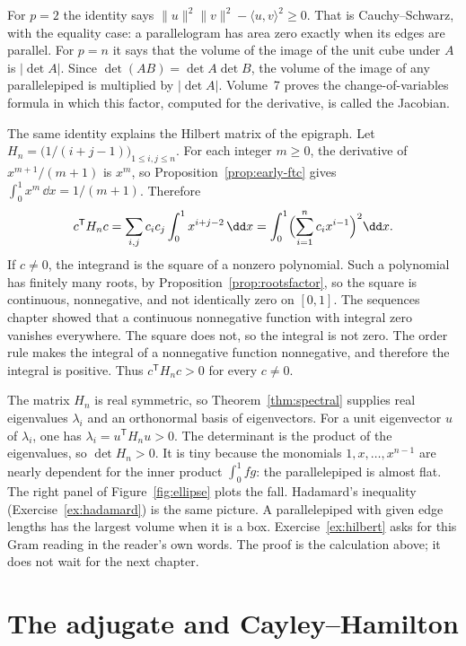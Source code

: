 For $p=2$ the identity says $\|u\|^2\|v\|^2-\langle u,v\rangle^2\ge0$. That is Cauchy--Schwarz, with the equality case: a parallelogram has area zero exactly when its edges are parallel. For $p=n$ it says that the volume of the image of the unit cube under $A$ is $|\det A|$. Since $\det(AB)=\det A\det B$, the volume of the image of any parallelepiped is multiplied by $|\det A|$. Volume~7 proves the change-of-variables formula in which this factor, computed for the derivative, is called the Jacobian.

The same identity explains the Hilbert matrix of the epigraph. Let $H_n=\bigl(1/(i+j-1)\bigr)_{1\le i,j\le n}$. For each integer $m\ge0$, the derivative of $x^{m+1}/(m+1)$ is $x^m$, so Proposition~\ref{prop:early-ftc} gives $\int_0^1 x^m\,\dd x=1/(m+1)$. Therefore
\[
c^{\mathsf T}H_nc=\sum_{i,j}c_ic_j\int_0^1 x^{i+j-2}\,\dd x=\int_0^1\Bigl(\sum_{i=1}^n c_ix^{i-1}\Bigr)^2\dd x.
\]
If $c\ne0$, the integrand is the square of a nonzero polynomial. Such a polynomial has finitely many roots, by Proposition~\ref{prop:rootsfactor}, so the square is continuous, nonnegative, and not identically zero on $[0,1]$. The sequences chapter showed that a continuous nonnegative function with integral zero vanishes everywhere. The square does not, so the integral is not zero. The order rule makes the integral of a nonnegative function nonnegative, and therefore the integral is positive. Thus $c^{\mathsf T}H_nc>0$ for every $c\ne0$.

The matrix $H_n$ is real symmetric, so Theorem~\ref{thm:spectral} supplies real eigenvalues $\lambda_i$ and an orthonormal basis of eigenvectors. For a unit eigenvector $u$ of $\lambda_i$, one has $\lambda_i=u^{\mathsf T}H_nu>0$. The determinant is the product of the eigenvalues, so $\det H_n>0$. It is tiny because the monomials $1,x,\dots,x^{n-1}$ are nearly dependent for the inner product $\int_0^1 fg$: the parallelepiped is almost flat. The right panel of Figure~\ref{fig:ellipse} plots the fall. Hadamard's inequality (Exercise~\ref{ex:hadamard}) is the same picture. A parallelepiped with given edge lengths has the largest volume when it is a box. Exercise~\ref{ex:hilbert} asks for this Gram reading in the reader's own words. The proof is the calculation above; it does not wait for the next chapter.

\section{The adjugate and Cayley--Hamilton}

